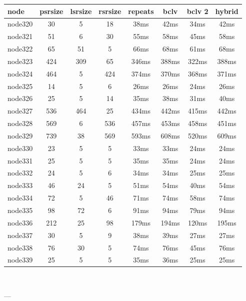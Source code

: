 \begin{tabular}{|l|c|c|c|c|c|c|c|}
\hline node & psrsize & lsrsize & rsrsize   & repeats & bclv & bclv 2 & hybrid\\
    \hline node320 & 30 & 5 & 18 & 38ms & 42ms & 34ms & 42ms\\
    \hline node321 & 51 & 6 & 30 & 55ms & 58ms & 45ms & 58ms\\
    \hline node322 & 65 & 51 & 5 & 66ms & 68ms & 61ms & 68ms\\
    \hline node323 & 424 & 309 & 65 & 346ms & 388ms & 322ms & 388ms\\
    \hline node324 & 464 & 5 & 424 & 374ms & 370ms & 368ms & 371ms\\
    \hline node325 & 14 & 5 & 6 & 26ms & 26ms & 24ms & 26ms\\
    \hline node326 & 25 & 5 & 14 & 35ms & 38ms & 31ms & 40ms\\
    \hline node327 & 536 & 464 & 25 & 434ms & 442ms & 415ms & 442ms\\
    \hline node328 & 569 & 6 & 536 & 457ms & 453ms & 458ms & 451ms\\
    \hline node329 & 739 & 38 & 569 & 593ms & 608ms & 520ms & 609ms\\
    \hline node330 & 23 & 5 & 5 & 33ms & 33ms & 24ms & 24ms\\
    \hline node331 & 25 & 5 & 5 & 35ms & 35ms & 24ms & 24ms\\
    \hline node332 & 24 & 5 & 6 & 34ms & 34ms & 25ms & 25ms\\
    \hline node333 & 46 & 24 & 5 & 51ms & 54ms & 40ms & 54ms\\
    \hline node334 & 72 & 5 & 46 & 71ms & 74ms & 58ms & 74ms\\
    \hline node335 & 98 & 72 & 6 & 91ms & 94ms & 79ms & 94ms\\
    \hline node336 & 212 & 25 & 98 & 179ms & 194ms & 120ms & 195ms\\
    \hline node337 & 30 & 5 & 9 & 38ms & 39ms & 27ms & 27ms\\
    \hline node338 & 76 & 30 & 5 & 74ms & 76ms & 45ms & 76ms\\
    \hline node339 & 25 & 5 & 5 & 35ms & 36ms & 25ms & 25ms\\

\hline
\end{tabular} \

---



